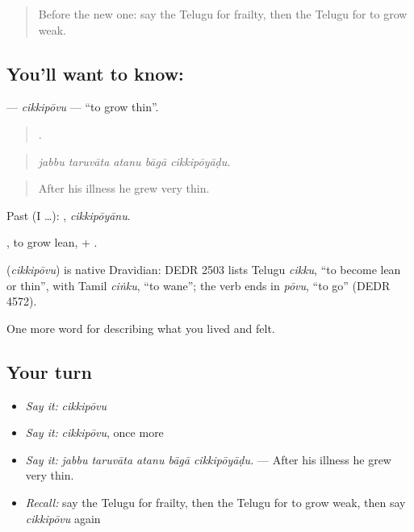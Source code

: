 \label{lesson:TE-C521-cikkipovu}



\begin{quote}
Before the new one: say the Telugu for frailty, then the Telugu for to grow weak.
\end{quote}

\subsection*{You'll want to know: }
\textbf{} — \emph{cikkipōvu} — \textquotedblleft{}to grow thin\textquotedblright{}.

\begin{quote}
    .
\end{quote}

\begin{quote}
\emph{jabbu taruvāta atanu bāgā cikkipōyāḍu.}
\end{quote}

\begin{quote}
After his illness he grew very thin.
\end{quote}

Past (I …): , \emph{cikkipōyānu}.

, to grow lean, + .

\begin{cousinweb}
\textbf{} (\emph{cikkipōvu}) is native Dravidian: DEDR 2503 lists Telugu \emph{cikku}, \textquotedblleft{}to become lean or thin\textquotedblright{}, with Tamil \emph{ciṅku}, \textquotedblleft{}to wane\textquotedblright{}; the verb ends in \emph{pōvu}, \textquotedblleft{}to go\textquotedblright{} (DEDR 4572).
\end{cousinweb}

\begin{grammarlens}[title={What you've built}]
One more word for describing what you lived and felt.
\end{grammarlens}

\subsection*{Your turn}
\begin{itemize}
\raggedright
  \item \emph{Say it:} \emph{cikkipōvu}
  \item \emph{Say it:} \emph{cikkipōvu}, once more
  \item \emph{Say it:} \emph{jabbu taruvāta atanu bāgā cikkipōyāḍu.} — After his illness he grew very thin.
  \item \emph{Recall:} say the Telugu for frailty, then the Telugu for to grow weak, then say \emph{cikkipōvu} again
\end{itemize}

